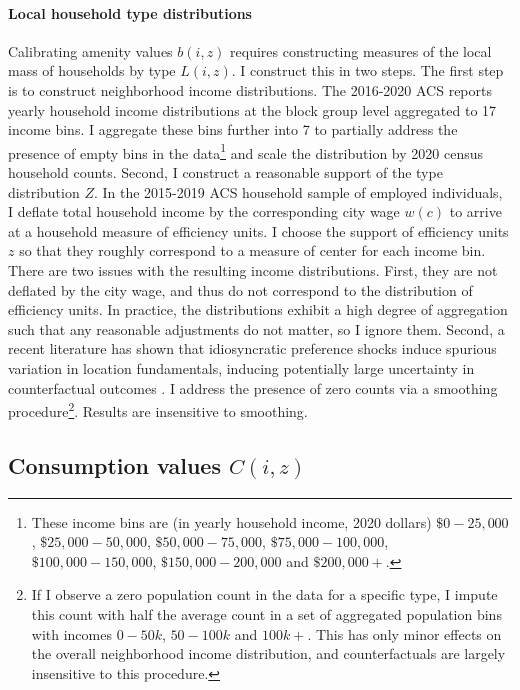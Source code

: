 \documentclass[12pt]{article}
\begin{document}
\paragraph*{Local household type distributions}\label{Calibration:LocalType} Calibrating amenity values $b(i, z)$ requires constructing measures of the local mass of households by type $L(i, z)$. I construct this in two steps. The first step is to construct neighborhood income distributions. The 2016-2020 ACS reports yearly household income distributions at the block group level aggregated to 17 income bins. I aggregate these bins further into 7 to partially address the presence of empty bins in the data\footnote{These income bins are (in yearly household income, 2020 dollars) $\$0-25,000$, $\$25,000-50,000$, $\$50,000-75,000$, $\$75,000-100,000$, $\$100,000-150,000$, $\$150,000-200,000$ and $\$200,000+$.} and scale the distribution by 2020 census household counts. Second, I construct a reasonable support of the type distribution $Z$. In the 2015-2019 ACS household sample of employed individuals, I deflate total household income by the corresponding city wage $w(c)$ to arrive at a household measure of efficiency units. I choose the support of efficiency units $z$ so that they roughly correspond to a measure of center for each income bin. There are two issues with the resulting income distributions. First, they are not deflated by the city wage, and thus do not correspond to the distribution of efficiency units. In practice, the distributions exhibit a high degree of aggregation such that any reasonable adjustments do not matter, so I ignore them. Second, a recent literature has shown that idiosyncratic preference shocks induce spurious variation in location fundamentals, inducing potentially large uncertainty in counterfactual outcomes \citep{DingelTintelnot:2021}. I address the presence of zero counts via a smoothing procedure\footnote{If I observe a zero population count in the data for a specific type, I impute this count with half the average count in a set of aggregated population bins with incomes $0-50k$, $50-100k$ and $100k+$. This has only minor effects on the overall neighborhood income distribution, and counterfactuals are largely insensitive to this procedure.}. Results are insensitive to smoothing.

\subsection{Consumption values $C(i, z)$}\label{Calibration:Consumption}
\end{document}
